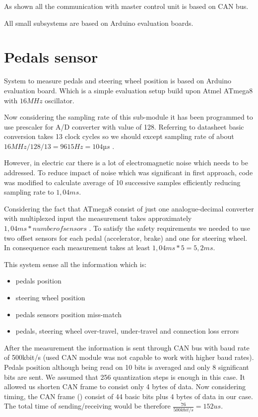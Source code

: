 
As shown all the communication with master control unit is based on CAN bus. 






All small subsystems are based on Arduino evaluation boards.


\section{Pedals sensor}
System to measure pedals and steering wheel position is based on Arduino evaluation board. Which is a simple evaluation setup build upon Atmel ATmega8 with $16MHz$ oscillator.

Now considering the sampling rate of this sub-module it has been programmed to use prescaler for A/D converter with value of 128. Referring to datasheet basic conversion takes 13 clock cycles so we should except sampling rate of about $16MHz/128/13 = 9615Hz = 104µs$ \cite{Atmega8}.

However, in electric car there is a lot of electromagnetic noise which needs to be addressed. To reduce impact of noise which was significant in first approach, code was modified to calculate average of 10 successive samples efficiently reducing sampling rate to $1,04ms$.

Considering the fact that ATmega8 consist of just one analogue-decimal converter with multiplexed input the measurement takes approximately $1,04ms * number of sensors$ \cite{Atmega8}.
To satisfy the safety requirements we needed to use two offset sensors for each pedal (accelerator, brake) and one for steering wheel. In consequence each measurement takes at least $1,04ms * 5 = 5,2ms$.

This system sense all the information which is:
\begin{itemize}
    \item pedals position
    \item steering wheel position
    \item pedals sensors position miss-match
    \item pedals, steering wheel over-travel, under-travel and connection loss errors
\end{itemize}

After the measurement the information is sent through CAN bus with baud rate of 500kbit/s (used CAN module was not capable to work with higher baud rates). Pedals position although being read on 10 bits is averaged and only 8 significant bits are sent. We assumed that 256 quantization steps is enough in this case. It allowed us shorten CAN frame to consist only 4 bytes of data.
Now considering timing, the CAN frame () consist of 44 basic bits plus 4 bytes of data in our case. The total time of sending/receiving would be therefore $\frac{76}{500kbit/s} = 152us$.

